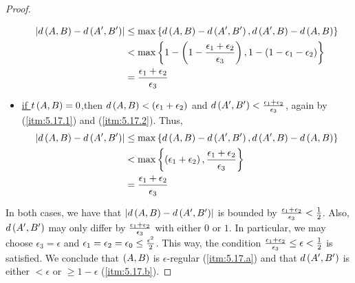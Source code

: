 \begin{proof}
\begin{itemize}
\begin{align*}
                        \left| d \left( A,B \right) - d \left( A',B' \right) \right|
                            & \leq \max \left\{ d \left( A,B \right) - d \left( A',B' \right), d \left( A',B \right) - d \left( A,B \right) \right\} \\
                            & < \max \left\{  1 - \left( 1 - {{\epsilon_1 + \epsilon_2} \over \epsilon_3} \right),
                                1 - \left( 1 - \epsilon_1 - \epsilon_2 \right) \right\} \\
                            & = {{\epsilon_1 + \epsilon_2} \over \epsilon_3}
                    \end{align*}
                \item \underline{if $t\left( A,B \right) = 0$},then $d\left( A,B \right) < \left( \epsilon_1 + \epsilon_2 \right)$
                    and $d \left( A',B' \right) < {{\epsilon_1 + \epsilon_2} \over \epsilon_3}$, again by (\ref{itm:5.17.1}) and
                    (\ref{itm:5.17.2}).
                    Thus,
                    \begin{align*}
                        \left| d \left( A,B \right) - d \left( A',B' \right) \right|
                            & \leq \max \left\{ d \left( A,B \right) - d \left( A',B' \right), d \left( A',B \right) - d \left( A,B \right) \right\} \\
                            & < \max \left\{ \left( \epsilon_1 + \epsilon_2 \right), {{\epsilon_1 + \epsilon_2} \over \epsilon_3} \right\} \\
                            & = {{\epsilon_1 + \epsilon_2} \over \epsilon_3}
                    \end{align*}
            \end{itemize}
            In both cases, we have that $\left| d \left( A,B \right) - d \left( A',B' \right) \right|$ is bounded by
            ${{\epsilon_1 + \epsilon_2} \over \epsilon_3} < {1 \over 2}$.
            Also, $d \left( A', B' \right)$ may only differ by ${{\epsilon_1 + \epsilon_2} \over \epsilon_3}$ with either
            $0$ or $1$.
            In particular, we may choose $\epsilon_3 = \epsilon$ and $\epsilon_1 = \epsilon_2 = \epsilon_0 \leq {{\epsilon^2} \over 2}$.
            This way, the condition ${{\epsilon_1 + \epsilon_2} \over \epsilon_3} \leq \epsilon < {1 \over 2}$ is satisfied.
            We conclude that $\left( A,B \right)$ is $\epsilon$-regular (\ref{itm:5.17.a}) and that $d \left( A',B' \right)$ is either
            $< \epsilon$ or $\geq 1 - \epsilon$ (\ref{itm:5.17.b}).
        \end{proof}

